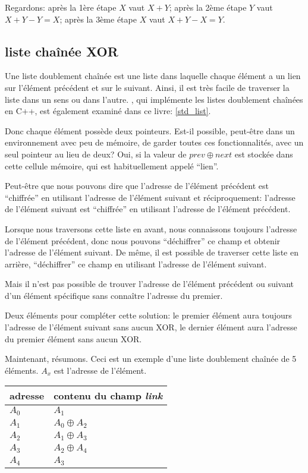 Regardons:
après la 1ère étape $X$ vaut $X+Y$;
après la 2ème étape $Y$ vaut $X+Y-Y=X$;
après la 3ème étape $X$ vaut $X+Y-X=Y$.

\subsection{liste chaînée XOR}

Une liste doublement chaînée est une liste dans laquelle chaque élément a un lien
sur l'élément précédent et sur le suivant.
Ainsi, il est très facile de traverser la liste dans un sens ou dans l'autre.
, qui implémente les listes doublement chaînées en C++, est également
examiné dans ce livre: \ref{std_list}.

Donc chaque élément possède deux pointeurs.
Est-il possible, peut-être dans un environnement avec peu de mémoire, de garder toutes
ces fonctionnalités, avec un seul pointeur au lieu de deux?
Oui, si la valeur de $prev \oplus next$ est stockée dans cette cellule mémoire, qui
est habituellement appelé ``lien''.

Peut-être que nous pouvons dire que l'adresse de l'élément précédent est ``chiffrée''
en utilisant l'adresse de l'élément suivant et réciproquement:
l'adresse de l'élément suivant est ``chiffrée'' en utilisant l'adresse de l'élément
précédent.

Lorsque nous traversons cette liste en avant, nous connaissons toujours l'adresse
de l'élément précédent, donc nous pouvons ``déchiffrer'' ce champ et obtenir l'adresse
de l'élément suivant.
De même, il est possible de traverser cette liste en arrière, ``déchiffrer'' ce champ
en utilisant l'adresse de l'élément suivant.

Mais il n'est pas possible de trouver l'adresse de l'élément précédent ou suivant
d'un élément spécifique sans connaître l'adresse du premier.

Deux éléments pour compléter cette solution: le premier élément aura toujours l'adresse
de l'élément suivant sans aucun XOR, le dernier élément aura l'adresse du premier
élément sans aucun XOR.

Maintenant, résumons. Ceci est un exemple d'une liste doublement chaînée de 5 éléments.
$A_x$ est l'adresse de l'élément.

\begin{center}
\begin{tabular}{ | l | l | }
	\hline
	\HeaderColor adresse & \HeaderColor contenu du champ \emph{link} \\
	\hline
	$A_0$ & $A_1$ \\
	\hline
	$A_1$ & $A_0 \oplus A_2$ \\
	\hline
	$A_2$ & $A_1 \oplus A_3$ \\
	\hline
	$A_3$ & $A_2 \oplus A_4$ \\
	\hline
	$A_4$ & $A_3$ \\
	\hline
\end{tabular}
\end{center}

